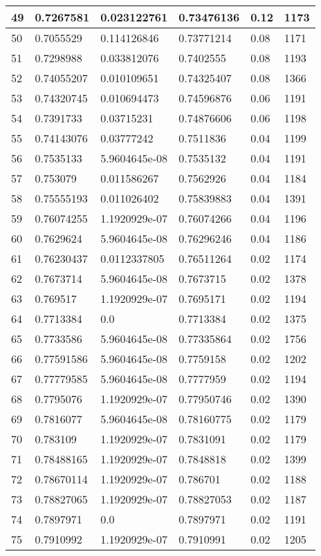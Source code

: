 \begin{longtable}{|l|l|l|l|l|l|}
49 & 0.7267581 & 0.023122761 & 0.73476136 & 0.12 & 1173 \\ \hline 
50 & 0.7055529 & 0.114126846 & 0.73771214 & 0.08 & 1171 \\ \hline 
51 & 0.7298988 & 0.033812076 & 0.7402555 & 0.08 & 1193 \\ \hline 
52 & 0.74055207 & 0.010109651 & 0.74325407 & 0.08 & 1366 \\ \hline 
53 & 0.74320745 & 0.010694473 & 0.74596876 & 0.06 & 1191 \\ \hline 
54 & 0.7391733 & 0.03715231 & 0.74876606 & 0.06 & 1198 \\ \hline 
55 & 0.74143076 & 0.03777242 & 0.7511836 & 0.04 & 1199 \\ \hline 
56 & 0.7535133 & 5.9604645e-08 & 0.7535132 & 0.04 & 1191 \\ \hline 
57 & 0.753079 & 0.011586267 & 0.7562926 & 0.04 & 1184 \\ \hline 
58 & 0.75555193 & 0.011026402 & 0.75839883 & 0.04 & 1391 \\ \hline 
59 & 0.76074255 & 1.1920929e-07 & 0.76074266 & 0.04 & 1196 \\ \hline 
60 & 0.7629624 & 5.9604645e-08 & 0.76296246 & 0.04 & 1186 \\ \hline 
61 & 0.76230437 & 0.0112337805 & 0.76511264 & 0.02 & 1174 \\ \hline 
62 & 0.7673714 & 5.9604645e-08 & 0.7673715 & 0.02 & 1378 \\ \hline 
63 & 0.769517 & 1.1920929e-07 & 0.7695171 & 0.02 & 1194 \\ \hline 
64 & 0.7713384 & 0.0 & 0.7713384 & 0.02 & 1375 \\ \hline 
65 & 0.7733586 & 5.9604645e-08 & 0.77335864 & 0.02 & 1756 \\ \hline 
66 & 0.77591586 & 5.9604645e-08 & 0.7759158 & 0.02 & 1202 \\ \hline 
67 & 0.77779585 & 5.9604645e-08 & 0.7777959 & 0.02 & 1194 \\ \hline 
68 & 0.7795076 & 1.1920929e-07 & 0.77950746 & 0.02 & 1390 \\ \hline 
69 & 0.7816077 & 5.9604645e-08 & 0.78160775 & 0.02 & 1179 \\ \hline 
70 & 0.783109 & 1.1920929e-07 & 0.7831091 & 0.02 & 1179 \\ \hline 
71 & 0.78488165 & 1.1920929e-07 & 0.7848818 & 0.02 & 1399 \\ \hline 
72 & 0.78670114 & 1.1920929e-07 & 0.786701 & 0.02 & 1188 \\ \hline 
73 & 0.78827065 & 1.1920929e-07 & 0.78827053 & 0.02 & 1187 \\ \hline 
74 & 0.7897971 & 0.0 & 0.7897971 & 0.02 & 1191 \\ \hline 
75 & 0.7910992 & 1.1920929e-07 & 0.7910991 & 0.02 & 1205 \\ \hline 
\end{longtable}